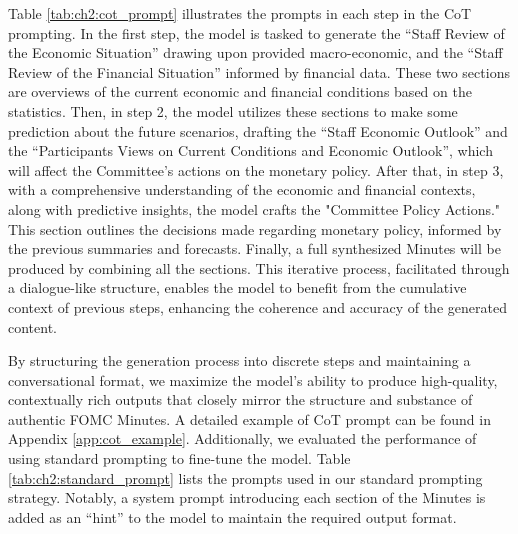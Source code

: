 Table \ref{tab:ch2:cot_prompt} illustrates the prompts in each step in the CoT prompting. In the first step, the model is tasked to generate the ``Staff Review of the Economic Situation'' drawing upon provided macro-economic, and the ``Staff Review of the Financial Situation'' informed by financial data. These two sections are overviews of the current economic and financial conditions based on the statistics. Then, in step 2, the model utilizes these sections to make some prediction about the future scenarios, drafting the ``Staff Economic Outlook'' and the ``Participants Views on Current Conditions and Economic Outlook'', which will affect the Committee's actions on the monetary policy. After that, in step 3, with a comprehensive understanding of the economic and financial contexts, along with predictive insights, the model crafts the "Committee Policy Actions." This section outlines the decisions made regarding monetary policy, informed by the previous summaries and forecasts. Finally, a full synthesized Minutes will be produced by combining all the sections. This iterative process, facilitated through a dialogue-like structure, enables the model to benefit from the cumulative context of previous steps, enhancing the coherence and accuracy of the generated content. 

By structuring the generation process into discrete steps and maintaining a conversational format, we maximize the model's ability to produce high-quality, contextually rich outputs that closely mirror the structure and substance of authentic FOMC Minutes. A detailed example of CoT prompt can be found in Appendix \ref{app:cot_example}. Additionally, we evaluated the performance of using standard prompting to fine-tune the model. Table \ref{tab:ch2:standard_prompt} lists the prompts used in our standard prompting strategy. Notably, a system prompt introducing each section of the Minutes is added as an ``hint'' to the model to maintain the required output format.


